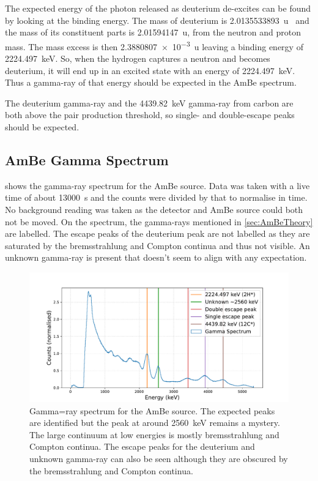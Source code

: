 \documentclass[11pt]{article}
\numberwithin{equation}{section}
\numberwithin{figure}{section}
\numberwithin{table}{section}
\begin{document}
The expected energy of the photon released as deuterium de-excites can be found by looking at the binding energy. The mass of deuterium is \SI{2.0135533893}{u}~\cite{deuterium} and the mass of its constituent parts is \SI{2.01594147}{u}, from the neutron and proton mass. The mass excess is then \SI{2.3880807e-3}{u} leaving a binding energy of \SI{2224.497}{\kilo\electronvolt}. So, when the hydrogen captures a neutron and becomes deuterium, it will end up in an excited state with an energy of \SI{2224.497}{\kilo\electronvolt}. Thus a gamma-ray of that energy should be expected in the AmBe spectrum. 

The deuterium gamma-ray and the \SI{4439.82}{\kilo\electronvolt} gamma-ray from carbon are both above the pair production threshold, so single- and double-escape peaks should be expected. 

\subsection{AmBe Gamma Spectrum}
 shows the gamma-ray spectrum for the AmBe source. Data was taken with a live time of about \SI{13000}{\second} and the counts were divided by that to normalise in time. No background reading was taken as the detector and AmBe source could both not be moved. On the spectrum, the gamma-rays mentioned in \cref{sec:AmBeTheory} are labelled. The escape peaks of the deuterium peak are not labelled as they are saturated by the bremsstrahlung and Compton continua and thus not visible. An unknown gamma-ray is present that doesn't seem to align with any expectation. 

\begin{figure}[h]
    \begin{center}
        \includegraphics[width=.8\textwidth]{Plots/ambe.pdf}
        \caption{Gamma=ray spectrum for the AmBe source. The expected peaks are identified but the peak at around \SI{2560}{\kilo\electronvolt} remains a mystery. The large continuum at low energies is mostly bremsstrahlung and Compton continua. The escape peaks for the deuterium and unknown gamma-ray can also be seen although they are obscured by the bremsstrahlung and Compton continua.}
        \label{fig:AmBe_Spectrum}
    \end{center}
\end{figure}
\end{document}
